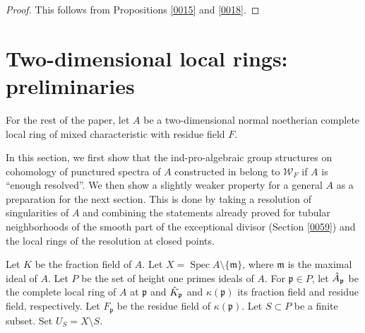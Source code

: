 \documentclass{amsart}
\theoremstyle{remark}
\numberwithin{equation}{section}
\newcommand{\ideal}[1]{\mathfrak{#1}}
\DeclareMathOperator{\Spec}{Spec}
\begin{document}
\begin{proof}
	This follows from Propositions \ref{0015} and \ref{0018}.
\end{proof}


\section{Two-dimensional local rings: preliminaries}
\label{0086}

For the rest of the paper,
let $A$ be a two-dimensional normal noetherian complete local ring
of mixed characteristic with residue field $F$.

In this section, we first show that
the ind-pro-algebraic group structures on cohomology of punctured spectra of $A$
constructed in \cite{Suz24} belong to $\mathcal{W}_{F}$
if $A$ is ``enough resolved''.
We then show a slightly weaker property for a general $A$
as a preparation for the next section.
This is done by taking a resolution of singularities of $A$
and combining the statements already proved for
tubular neighborhoods of the smooth part of the exceptional divisor (Section \ref{0059})
and the local rings of the resolution at closed points.

Let $K$ be the fraction field of $A$.
Let $X = \Spec A \setminus \{\ideal{m}\}$,
where $\ideal{m}$ is the maximal ideal of $A$.
Let $P$ be the set of height one primes ideals of $A$.
For $\ideal{p} \in P$, let $\Hat{A}_{\ideal{p}}$ be the complete local ring of $A$ at $\ideal{p}$
and $\Hat{K}_{\ideal{p}}$ and $\kappa(\ideal{p})$ its fraction field and residue field, respectively.
Let $F_{\ideal{p}}$ be the residue field of $\kappa(\ideal{p})$.
Let $S \subset P$ be a finite subset.
Set $U_{S} = X \setminus S$.
\end{document}
